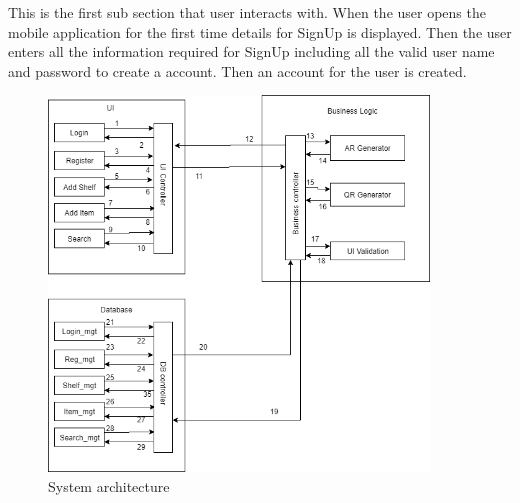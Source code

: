 This is the first sub section that user interacts with. When the user opens the mobile application for the first time details for SignUp is displayed. Then the user enters all the information required for SignUp including all the valid user name and password to create a account. Then an account for the user is created.

\begin{figure}[h!]
	\centering
 	\includegraphics[width=0.90\textwidth]{images/dataflow}
 \caption{System architecture}
\end{figure}
